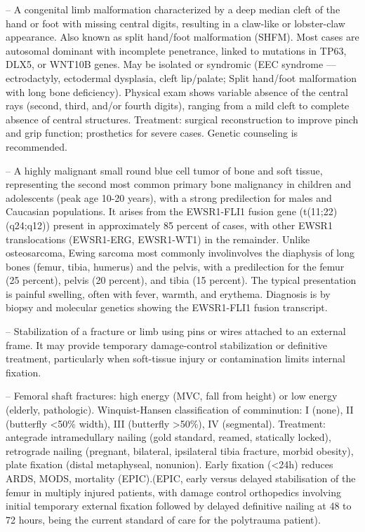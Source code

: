 -- A congenital limb malformation characterized by a deep median cleft of the hand or foot with missing central digits, resulting in a claw-like or lobster-claw appearance. Also known as split hand/foot malformation (SHFM). Most cases are autosomal dominant with incomplete penetrance, linked to mutations in TP63, DLX5, or WNT10B genes. May be isolated or syndromic (EEC syndrome — ectrodactyly, ectodermal dysplasia, cleft lip/palate; Split hand/foot malformation with long bone deficiency). Physical exam shows variable absence of the central rays (second, third, and/or fourth digits), ranging from a mild cleft to complete absence of central structures. Treatment: surgical reconstruction to improve pinch and grip function; prosthetics for severe cases. Genetic counseling is recommended.

-- A highly malignant small round blue cell tumor of bone and soft tissue, representing the second most common primary bone malignancy in children and adolescents (peak age 10-20 years), with a strong predilection for males and Caucasian populations. It arises from the EWSR1-FLI1 fusion gene (t(11;22)(q24;q12)) present in approximately 85 percent of cases, with other EWSR1 translocations (EWSR1-ERG, EWSR1-WT1) in the remainder. Unlike osteosarcoma, Ewing sarcoma most commonly involinvolves the diaphysis of long bones (femur, tibia, humerus) and the pelvis, with a predilection for the femur (25 percent), pelvis (20 percent), and tibia (15 percent). The typical presentation is painful swelling, often with fever, warmth, and erythema. Diagnosis is by biopsy and molecular genetics showing the EWSR1-FLI1 fusion transcript.

-- Stabilization of a fracture or limb using pins or wires attached to an external frame. It may provide temporary damage-control stabilization or definitive treatment, particularly when soft-tissue injury or contamination limits internal fixation.

-- Femoral shaft fractures: high energy (MVC, fall from height) or low energy (elderly, pathologic). Winquist-Hansen classification of comminution: I (none), II (butterfly <50\% width), III (butterfly >50\%), IV (segmental). Treatment: antegrade intramedullary nailing (gold standard, reamed, statically locked), retrograde nailing (pregnant, bilateral, ipsilateral tibia fracture, morbid obesity), plate fixation (distal metaphyseal, nonunion). Early fixation (<24h) reduces ARDS, MODS, mortality (EPIC).(EPIC, early versus delayed stabilisation of the femur in multiply injured patients, with damage control orthopedics involving initial temporary external fixation followed by delayed definitive nailing at 48 to 72 hours, being the current standard of care for the polytrauma patient).

